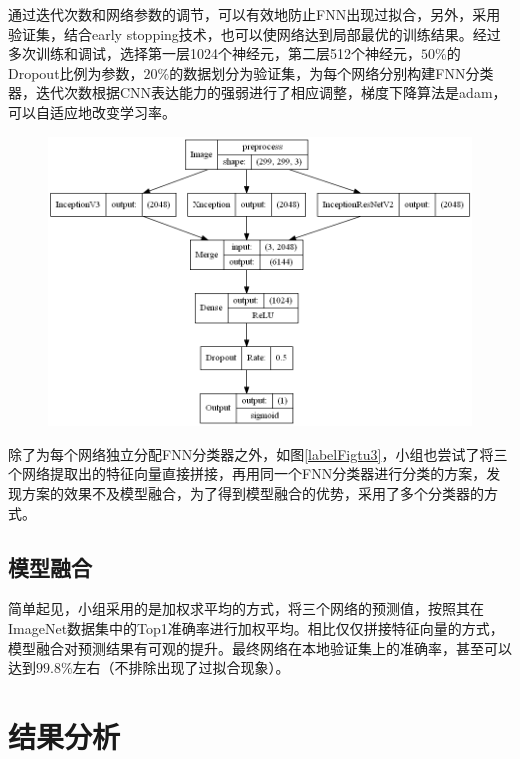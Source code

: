 \documentclass[10.5pt,twocolumn]{jbuaa}
\begin{document}
通过迭代次数和网络参数的调节，可以有效地防止FNN出现过拟合，另外，采用验证集，结合early stopping技术，也可以使网络达到局部最优的训练结果。经过多次训练和调试，选择第一层1024个神经元，第二层512个神经元，$50\%$的Dropout比例为参数，$20\%$的数据划分为验证集，为每个网络分别构建FNN分类器，迭代次数根据CNN表达能力的强弱进行了相应调整，梯度下降算法是adam，可以自适应地改变学习率。

\begin{figure}[h!]
\centering
\includegraphics [scale=0.3,trim=0 0 0 0]{./image/concat3.png}
\end{figure}

除了为每个网络独立分配FNN分类器之外，如图\ref{labelFigtu3}，小组也尝试了将三个网络提取出的特征向量直接拼接，再用同一个FNN分类器进行分类的方案，发现方案的效果不及模型融合，为了得到模型融合的优势，采用了多个分类器的方式。
\subsection{模型融合}
简单起见，小组采用的是加权求平均的方式，将三个网络的预测值，按照其在ImageNet数据集中的Top1准确率进行加权平均。相比仅仅拼接特征向量的方式，模型融合对预测结果有可观的提升。最终网络在本地验证集上的准确率，甚至可以达到$99.8\%$左右（不排除出现了过拟合现象）。

\section{结果分析}
\end{document}
